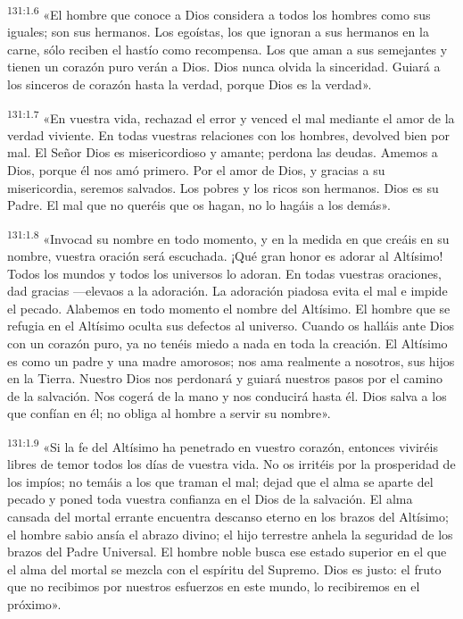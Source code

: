 \par 
\textsuperscript{131:1.6} «El hombre que conoce a Dios considera a todos los hombres como sus iguales; son sus hermanos. Los egoístas, los que ignoran a sus hermanos en la carne, sólo reciben el hastío como recompensa. Los que aman a sus semejantes y tienen un corazón puro verán a Dios. Dios nunca olvida la sinceridad. Guiará a los sinceros de corazón hasta la verdad, porque Dios es la verdad».

\par 
\textsuperscript{131:1.7} «En vuestra vida, rechazad el error y venced el mal mediante el amor de la verdad viviente. En todas vuestras relaciones con los hombres, devolved bien por mal. El Señor Dios es misericordioso y amante; perdona las deudas. Amemos a Dios, porque él nos amó primero. Por el amor de Dios, y gracias a su misericordia, seremos salvados. Los pobres y los ricos son hermanos. Dios es su Padre. El mal que no queréis que os hagan, no lo hagáis a los demás».

\par 
\textsuperscript{131:1.8} «Invocad su nombre en todo momento, y en la medida en que creáis en su nombre, vuestra oración será escuchada. ¡Qué gran honor es adorar al Altísimo! Todos los mundos y todos los universos lo adoran. En todas vuestras oraciones, dad gracias ---elevaos a la adoración. La adoración piadosa evita el mal e impide el pecado. Alabemos en todo momento el nombre del Altísimo. El hombre que se refugia en el Altísimo oculta sus defectos al universo. Cuando os halláis ante Dios con un corazón puro, ya no tenéis miedo a nada en toda la creación. El Altísimo es como un padre y una madre amorosos; nos ama realmente a nosotros, sus hijos en la Tierra. Nuestro Dios nos perdonará y guiará nuestros pasos por el camino de la salvación. Nos cogerá de la mano y nos conducirá hasta él. Dios salva a los que confían en él; no obliga al hombre a servir su nombre».

\par 
\textsuperscript{131:1.9} «Si la fe del Altísimo ha penetrado en vuestro corazón, entonces viviréis libres de temor todos los días de vuestra vida. No os irritéis por la prosperidad de los impíos; no temáis a los que traman el mal; dejad que el alma se aparte del pecado y poned toda vuestra confianza en el Dios de la salvación. El alma cansada del mortal errante encuentra descanso eterno en los brazos del Altísimo; el hombre sabio ansía el abrazo divino; el hijo terrestre anhela la seguridad de los brazos del Padre Universal. El hombre noble busca ese estado superior en el que el alma del mortal se mezcla con el espíritu del Supremo. Dios es justo: el fruto que no recibimos por nuestros esfuerzos en este mundo, lo recibiremos en el próximo».

